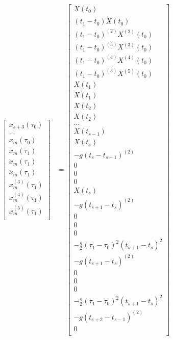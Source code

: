 \documentclass[11pt]{article}
\begin{document}
\begin{align}
\begin{bmatrix}
x_{s+3} (\tau_0) \\
... \\
x_{m} (\tau_0) \\
x_{m} (\tau_1) \\
\dot{x}_{m} (\tau_1) \\
\ddot{x}_{m} (\tau_1) \\
x^{(3)}_{m} (\tau_1) \\
x^{(4)}_{m} (\tau_1) \\
x^{(5)}_{m} (\tau_1) \\
 \end{bmatrix}
 &= 
 \begin{bmatrix}
  X (t_0) \\
  (t_1-t_0) \dot{X} (t_0) \\
  (t_1-t_0)^{(2)}  X^{(2)} (t_0) \\
    (t_1-t_0)^{(3)}  X^{(3)} (t_0) \\
      (t_1-t_0)^{(4)}  X^{(4)} (t_0) \\
  (t_1-t_0)^{(5)}  X^{(5)} (t_0) \\
    X (t_1) \\
     X (t_1) \\
     X (t_2) \\
X (t_2) \\
  ... \\
  X(t_{s-1}) \\
       X (t_s) \\
 -g (t_s-t_{s-1})^{(2)}  \\
 0 \\
 0 \\
 0 \\
         X (t_{s}) \\
 -g (t_{s+1}-t_{s})^{(2)}  \\
 0 \\
 0 \\
 0 \\
  -\frac{g}{2} (\tau_1-\tau_0)^2 (t_{s+1}-t_s)^2 \\        %
 -g (t_{s+1}-t_{s})^{(2)}  \\
 0 \\
 0 \\
 0 \\
  -\frac{g}{2} (\tau_1-\tau_0)^2 (t_{s+1}-t_s)^2 \\  %
 -g (t_{s+2}-t_{s-1})^{(2)}  \\
 0 \\

\end{bmatrix}
\end{align}
\end{document}
